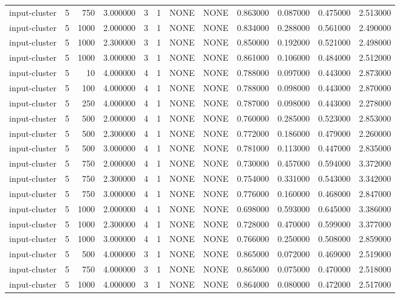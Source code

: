 \begin{tabular}{lrrrllllrrrr}
input-cluster & 5 & 750 & 3.000000 & 3 & 1 & NONE & NONE & 0.863000 & 0.087000 & 0.475000 & 2.513000 \\
input-cluster & 5 & 1000 & 2.000000 & 3 & 1 & NONE & NONE & 0.834000 & 0.288000 & 0.561000 & 2.490000 \\
input-cluster & 5 & 1000 & 2.300000 & 3 & 1 & NONE & NONE & 0.850000 & 0.192000 & 0.521000 & 2.498000 \\
input-cluster & 5 & 1000 & 3.000000 & 3 & 1 & NONE & NONE & 0.861000 & 0.106000 & 0.484000 & 2.512000 \\
input-cluster & 5 & 10 & 4.000000 & 4 & 1 & NONE & NONE & 0.788000 & 0.097000 & 0.443000 & 2.873000 \\
input-cluster & 5 & 100 & 4.000000 & 4 & 1 & NONE & NONE & 0.788000 & 0.098000 & 0.443000 & 2.870000 \\
input-cluster & 5 & 250 & 4.000000 & 4 & 1 & NONE & NONE & 0.787000 & 0.098000 & 0.443000 & 2.278000 \\
input-cluster & 5 & 500 & 2.000000 & 4 & 1 & NONE & NONE & 0.760000 & 0.285000 & 0.523000 & 2.853000 \\
input-cluster & 5 & 500 & 2.300000 & 4 & 1 & NONE & NONE & 0.772000 & 0.186000 & 0.479000 & 2.260000 \\
input-cluster & 5 & 500 & 3.000000 & 4 & 1 & NONE & NONE & 0.781000 & 0.113000 & 0.447000 & 2.835000 \\
input-cluster & 5 & 750 & 2.000000 & 4 & 1 & NONE & NONE & 0.730000 & 0.457000 & 0.594000 & 3.372000 \\
input-cluster & 5 & 750 & 2.300000 & 4 & 1 & NONE & NONE & 0.754000 & 0.331000 & 0.543000 & 3.342000 \\
input-cluster & 5 & 750 & 3.000000 & 4 & 1 & NONE & NONE & 0.776000 & 0.160000 & 0.468000 & 2.847000 \\
input-cluster & 5 & 1000 & 2.000000 & 4 & 1 & NONE & NONE & 0.698000 & 0.593000 & 0.645000 & 3.386000 \\
input-cluster & 5 & 1000 & 2.300000 & 4 & 1 & NONE & NONE & 0.728000 & 0.470000 & 0.599000 & 3.377000 \\
input-cluster & 5 & 1000 & 3.000000 & 4 & 1 & NONE & NONE & 0.766000 & 0.250000 & 0.508000 & 2.859000 \\
input-cluster & 5 & 500 & 4.000000 & 3 & 1 & NONE & NONE & 0.865000 & 0.072000 & 0.469000 & 2.519000 \\
input-cluster & 5 & 750 & 4.000000 & 3 & 1 & NONE & NONE & 0.865000 & 0.075000 & 0.470000 & 2.518000 \\
input-cluster & 5 & 1000 & 4.000000 & 3 & 1 & NONE & NONE & 0.864000 & 0.080000 & 0.472000 & 2.517000 \\

\end{tabular}
